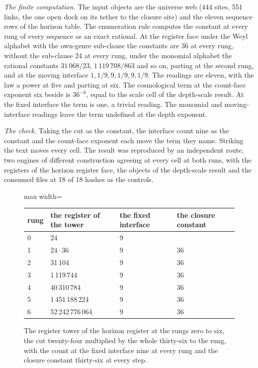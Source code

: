 \begin{chproof}
\textit{The finite computation.} The input objects are the universe web (444 sites, 551 links, the one open dock on its tether to the closure site) and the eleven sequence rows of the horizon table. The enumeration rule computes the constant at every rung of every sequence as an exact rational. At the register face under the Weyl alphabet with the own-genre sub-clause the constants are $36$ at every rung, without the sub-clause $24$ at every rung, under the monomial alphabet the rational constants $31\,068/23$, $1\,119\,708/863$ and so on, parting at the second rung, and at the moving interface $1, 1/9, 9, 1/9, 9, 1/9$. The readings are eleven, with the law a power at five and parting at six. The cosmological term at the count-face exponent six beside is $36^{-6}$, equal to the scale cell of the depth-scale result. At the fixed interface the term is one, a trivial reading. The monomial and moving-interface readings leave the term undefined at the depth exponent.

\textit{The check.} Taking the cut as the constant, the interface count nine as the constant and the count-face exponent each move the term they name. Striking the text moves every cell. The result was reproduced by an independent route, two engines of different construction agreeing at every cell at both runs, with the registers of the horizon register face, the objects of the depth-scale result and the consumed files at 18 of 18 hashes as the controls.
\end{chproof}
\begin{figure}[h]
\centering
\begin{adjustbox}{max width=\linewidth}\begin{tabular}{llll}
\hline
rung & the register of the tower & the fixed interface & the closure constant \\
\hline
0 & 24 & 9 & \\
1 & $24\cdot 36$ & 9 & 36 \\
2 & 31\,104 & 9 & 36 \\
3 & 1\,119\,744 & 9 & 36 \\
4 & 40\,310\,784 & 9 & 36 \\
5 & 1\,451\,188\,224 & 9 & 36 \\
6 & 52\,242\,776\,064 & 9 & 36 \\
\hline
\end{tabular}\end{adjustbox}
\caption{The register tower of the horizon register at the rungs zero to six, the cut twenty-four multiplied by the whole thirty-six to the rung, with the count at the fixed interface nine at every rung and the closure constant thirty-six at every step.}
\end{figure}
